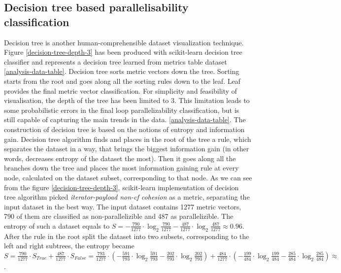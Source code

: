\subsection{Decision tree based parallelisability classification}
\qquad Decision tree is another human-comprehensible dataset visualization technique. Figure \ref{decision-tree-depth-3} has been produced with scikit-learn \cite{python-lib-scikit-learn} decision tree classifier and represents a decision tree learned from metrics table dataset \ref{analysis-data-table}. Decision tree sorts metric vectors down the tree. Sorting starts from the root and goes along all the sorting rules down to the leaf. Leaf provides the final metric vector classification. For simplicity and feasibility of visualisation, the depth of the tree has been limited to 3. This limitation leads to some probabilistic errors in the final loop parallelizability classification, but is still capable of capturing the main trends in the data. \ref{analysis-data-table}.\newline
\null\qquad The construction of decision tree is based on the notions of entropy and information gain. Decision tree algorithm finds and places in the root of the tree a rule, which separates the dataset in a way, that brings the biggest information gain (in other words, decreases entropy of the dataset the most). Then it goes along all the branches down the tree and places the most information gaining rule at every node, calculated on the dataset subset, corresponding to that node.\newline
\null\qquad As we can see from the figure \ref{decision-tree-depth-3}, scikit-learn implementation of decision tree algorithm picked \textit{iterator-payload non-cf cohesion} as a metric, separating the input dataset in the best way. The input dataset contains 1277 metric vectors, 790 of them are classified as non-parallelizible and 487 as parallelizible. The entropy of such a dataset equals to $S=-\frac{790}{1277}\cdot \log_{2}\frac{790}{1277}-\frac{487}{1277}\cdot \log_{2}\frac{487}{1277}\approx 0.96$. After the rule in the root split the dataset into two subsets, corresponding to the left and right subtrees, the entropy became $S=\frac{790}{1277}\cdot S_{True} + \frac{487}{1277}\cdot S_{False} = \frac{793}{1277}\cdot (-\frac{591}{793}\cdot \log_{2}\frac{591}{793}-\frac{202}{793}\cdot \log_{2}\frac{202}{793}) + \frac{484}{1277}\cdot (-\frac{199}{484}\cdot \log_{2}\frac{199}{484}-\frac{285}{484}\cdot \log_{2}\frac{285}{484})\approx $.     
